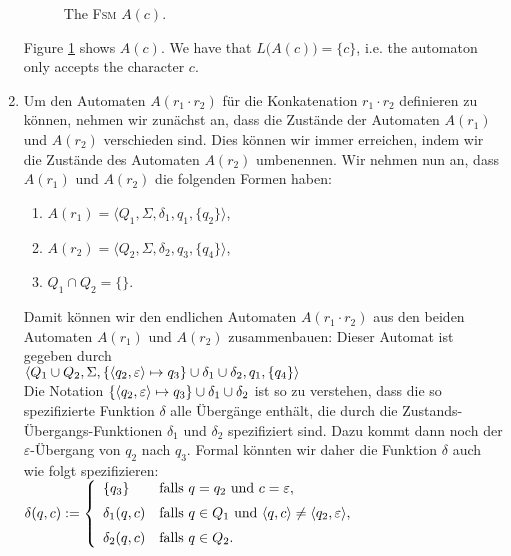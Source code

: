 \begin{enumerate}
      \begin{figure}[!ht]
        \centering
      \caption{The \textsc{Fsm} $A(c)$.}
      \label{fig:aChar.eps}
      \end{figure}
      Figure \ref{fig:aChar.eps} shows $A(c)$.
      We have that $L\bigl(A(c)\bigr) = \{c\}$, i.e. the automaton only accepts the character $c$. 
\item Um den Automaten $A(r_1 \cdot r_2)$ f\"ur die Konkatenation $r_1 \cdot r_2$ definieren
      zu k\"onnen, nehmen wir zun\"achst an, dass die 
      Zu\-st\"an\-de der Automaten $A(r_1)$ und $A(r_2)$ verschieden sind.  Dies k\"onnen
      wir immer erreichen, indem wir die Zust\"ande des Automaten $A(r_2)$ umbenennen.
      Wir nehmen nun an, dass $A(r_1)$ und $A(r_2)$ die folgenden Formen haben:
      \begin{enumerate}
      \item $A(r_1) = \langle Q_1, \Sigma, \delta_1, q_1, \{ q_2 \}\rangle$,
      \item $A(r_2) = \langle Q_2, \Sigma, \delta_2, q_3, \{ q_4 \}\rangle$,
      \item $Q_1 \cap Q_2 = \{\}$.
      \end{enumerate}
      Damit k\"onnen wir den endlichen Automaten $A(r_1 \cdot r_2)$ aus den beiden Automaten $A(r_1)$ und
      $A(r_2)$ zusammenbauen:  Dieser Automat ist gegeben durch
      \\[0.2cm]
      \hspace*{0.8cm}
       $\langle Q_1 \cup Q_2, \Sigma, 
                \{ \pair(q_2,\varepsilon) \mapsto q_3 \} 
                   \cup \delta_1 \cup \delta_2, q_1, \{ q_4 \} \rangle$
      \\[0.2cm]
      Die Notation $\{ \pair(q_2,\varepsilon) \mapsto q_3 \} \cup \delta_1 \cup \delta_2$
      ist so zu verstehen, dass die so spezifizierte Funktion $\delta$ alle \"Uberg\"ange
      enth\"alt, die durch die Zustands-\"Ubergangs-Funktionen $\delta_1$ und $\delta_2$
      spezifiziert sind.  Dazu kommt dann noch der $\varepsilon$-\"Ubergang von $q_2$ nach
      $q_3$.  Formal k\"onnten wir daher die Funktion $\delta$ auch wie folgt spezifizieren:
      \\[0.2cm]
      \hspace*{1.3cm}
      $\delta(q,c) := \left\{
      \begin{array}{ll}
        \{ q_3 \}       & \mbox{falls $q = q_2$ und $c = \varepsilon$}, \\[0.2cm]
        \delta_1(q, c)  & \mbox{falls $q \in Q_1$ und $\pair(q,c) \not= \pair(q_2,\varepsilon)$}, \\[0.2cm]
        \delta_2(q, c)  & \mbox{falls $q \in Q_2$.} 
      \end{array}\right.
      $
      \\[0.2cm]



\end{enumerate}
